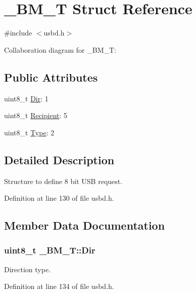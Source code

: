 \hypertarget{struct__BM__T}{}\section{\+\_\+\+B\+M\+\_\+T Struct Reference}
\label{struct__BM__T}


{\ttfamily \#include $<$usbd.\+h$>$}



Collaboration diagram for \+\_\+\+B\+M\+\_\+T\+:
\subsection*{Public Attributes}
\begin{DoxyCompactItemize}
\item 
uint8\+\_\+t \hyperlink{struct__BM__T_aabd052fb91ef09c571cd697a3f2cbf3f}{Dir}\+: 1
\item 
uint8\+\_\+t \hyperlink{struct__BM__T_a94927112fe5f66edfe58f7b357619128}{Recipient}\+: 5
\item 
uint8\+\_\+t \hyperlink{struct__BM__T_a5fd0780bac15d2e87e04493d68941415}{Type}\+: 2
\end{DoxyCompactItemize}


\subsection{Detailed Description}
Structure to define 8 bit U\+SB request. 

Definition at line 130 of file usbd.\+h.



\subsection{Member Data Documentation}
\subsubsection[{\texorpdfstring{Dir}{Dir}}]{\setlength{\rightskip}{0pt plus 5cm}uint8\+\_\+t \+\_\+\+B\+M\+\_\+\+T\+::\+Dir}\hypertarget{struct__BM__T_aabd052fb91ef09c571cd697a3f2cbf3f}{}\label{struct__BM__T_aabd052fb91ef09c571cd697a3f2cbf3f}
Direction type. 

Definition at line 134 of file usbd.\+h.

